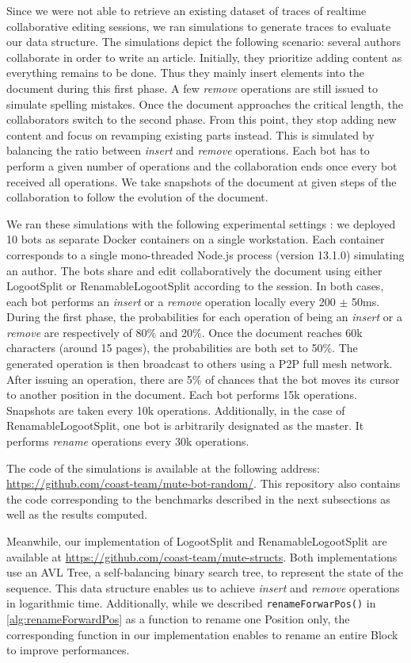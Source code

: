 \documentclass{article}
\theoremstyle{definition}
\begin{document}
Since we were not able to retrieve an existing dataset of traces of realtime collaborative editing sessions, we ran simulations to generate traces to evaluate our data structure.
The simulations depict the following scenario: several authors collaborate in order to write an article.
Initially, they prioritize adding content as everything remains to be done.
Thus they mainly insert elements into the document during this first phase.
A few \emph{remove} operations are still issued to simulate spelling mistakes.
Once the document approaches the critical length, the collaborators switch to the second phase.
From this point, they stop adding new content and focus on revamping existing parts instead.
This is simulated by balancing the ratio between \emph{insert} and \emph{remove} operations.
Each bot has to perform a given number of operations and the collaboration ends once every bot received all operations.
We take snapshots of the document at given steps of the collaboration to follow the evolution of the document.

We ran these simulations with the following experimental settings : we deployed 10 bots as separate Docker containers on a single workstation.
Each container corresponds to a single mono-threaded Node.js process (version 13.1.0) simulating an author.
The bots share and edit collaboratively the document using either LogootSplit or RenamableLogootSplit according to the session.
In both cases, each bot performs an \emph{insert} or a \emph{remove} operation locally every 200 $\pm$ 50ms.
During the first phase, the probabilities for each operation of being an \emph{insert} or a \emph{remove} are respectively of 80\% and 20\%.
Once the document reaches 60k characters (around 15 pages), the probabilities are both set to 50\%.
The generated operation is then broadcast to others using a \ac{P2P} full mesh network.
After issuing an operation, there are 5\% of chances that the bot moves its cursor to another position in the document.
Each bot performs 15k operations.
Snapshots are taken every 10k operations.
Additionally, in the case of RenamableLogootSplit, one bot is arbitrarily designated as the master.
It performs \emph{rename} operations every 30k operations.

The code of the simulations is available at the following address: \url{https://github.com/coast-team/mute-bot-random/}.
This repository also contains the code corresponding to the benchmarks described in the next subsections as well as the results computed.

Meanwhile, our implementation of LogootSplit and RenamableLogootSplit are available at \url{https://github.com/coast-team/mute-structs}.
Both implementations use an AVL Tree, a self-balancing binary search tree, to represent the state of the sequence.
This data structure enables us to achieve \emph{insert} and \emph{remove} operations in logarithmic time.
Additionally, while we described \verb|renameForwarPos()| in \autoref{alg:renameForwardPos} as a function to rename one Position only, the corresponding function in our implementation enables to rename an entire Block to improve performances.
\end{document}
